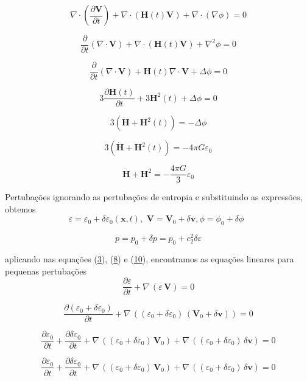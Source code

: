 \documentclass[a4paper,12pt]{article}
\begin{document}
$$\nabla\cdot \left(\dfrac{\partial \textbf{V} }{\partial t} \right)+\nabla\cdot \left( \mathbf{H}(t)\mathbf{V} \right)+\nabla\cdot \left(\nabla \phi\right) =0$$

$$ \dfrac{\partial}{\partial t} (\nabla\cdot\textbf{V})  +\nabla\cdot \left( \mathbf{H}(t)\mathbf{V}  \right)+\nabla^2 \phi =0$$	

$$ \dfrac{\partial}{\partial t} (\nabla\cdot\textbf{V})  +\mathbf{H}(t)\nabla\cdot \mathbf{V} +\Delta\phi =0$$

$$ 3\dfrac{\partial\mathbf{H}(t)}{\partial t}  +3\mathbf{H}^2(t) +\Delta\phi =0$$

$$ 3(\dot{\mathbf{H}}  +\mathbf{H}^2(t))  =-\Delta\phi$$

$$ 3(\dot{\mathbf{H}}  +\mathbf{H}^2(t))  =-4\pi G\varepsilon_0$$

\begin{equation}\label{eq34}
	\dot{\mathbf{H}} + \mathbf{H}^2 = - \dfrac{4\pi G}{3}\varepsilon_0 
\end{equation}

Pertubações ignorando as pertubações de entropia e substituindo as expressões, obtemos
\begin{equation}\label{eq35}
	\varepsilon = \varepsilon_0 + \delta\varepsilon_0 (\mathbf{x},t),\,\, \mathbf{V} = \mathbf{V}_0 + \delta\mathbf{v} , \phi= \phi_0 + \delta\phi\,\,\, 
\end{equation}

$$p = p_0 + \delta p= p_0 + c_2^2\delta\varepsilon$$

aplicando nas equações (\hyperref[eq3]{3}), (\hyperref[eq8]{8}) e (\hyperref[eq10]{10}), encontramos as equações lineares para pequenas pertubações
$$\dfrac{\partial \varepsilon}{\partial t} +\nabla \,(\varepsilon \, \textbf{V}) = 0$$

$$\dfrac{\partial (\varepsilon_0 + \delta\varepsilon_0)}{\partial t} +\nabla \,( (\varepsilon_0 + \delta\varepsilon_0) \, (\mathbf{V}_0 + \delta\mathbf{v})) = 0$$

$$\dfrac{\partial \varepsilon_0}{\partial t} +\dfrac{\partial \delta\varepsilon_0}{\partial t} +\nabla \,( (\varepsilon_0 + \delta\varepsilon_0) \, \mathbf{V}_0) +\nabla \,( (\varepsilon_0 + \delta\varepsilon_0) \, \delta\mathbf{v})= 0$$

$$\dfrac{\partial \varepsilon_0}{\partial t} +\dfrac{\partial \delta\varepsilon_0}{\partial t} +\nabla \,( (\varepsilon_0 + \delta\varepsilon_0) \, \mathbf{V}_0) +\nabla \,( (\varepsilon_0 + \delta\varepsilon_0) \, \delta\mathbf{v})= 0$$
\end{document}
